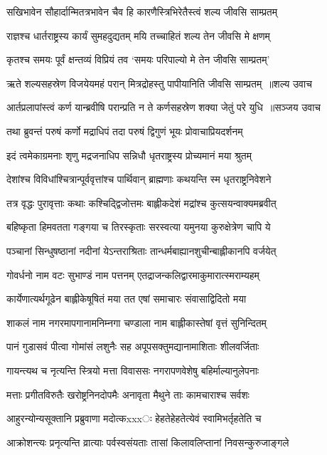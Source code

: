 \twolineshloka
{सखिभावेन सौहार्दान्मितत्रभावेन चैव हि}
{कारणैस्त्रिभिरेतैस्त्वं शल्य जीवसि साम्प्रतम्}


\twolineshloka
{राज्ञश्च धार्तराष्ट्रस्य कार्यं सुमहदुद्यतम्}
{मयि तच्चाहितं शल्य तेन जीवसि मे क्षणम्}


\twolineshloka
{कृतश्च समयः पूर्वं क्षन्तव्यं विप्रियं तव}
{`समयः परिपाल्यो मे तेन जीवसि साम्प्रतम्'}


\threelineshloka
{ऋते शल्यसहस्रेण विजयेयमहं परान्}
{मित्रद्रोहस्तु पापीयानिति जीवसि साम्प्रतम् ॥शल्य उवाच}
{}


\threelineshloka
{आर्तप्रलापांस्त्वं कर्ण यान्ब्रवीषि परान्प्रति}
{न ते कर्णसहस्रेण शक्या जेतुं परे युधि ॥सञ्जय उवाच}
{}


\twolineshloka
{तथा ब्रुवन्तं परुषं कर्णो मद्राधिपं तदा}
{परुषं द्विगुणं भूयः प्रोवाचाप्रियदर्शनम्}


\twolineshloka
{इदं त्वमेकाग्रमनाः शृणु मद्रजनाधिप}
{सन्निधौ धृतराष्ट्रस्य प्रोच्यमानं मया श्रुतम्}


\twolineshloka
{देशांश्च विविधांश्चित्रान्पूर्ववृत्तांश्च पार्थिवान्}
{ब्राह्मणाः कथयन्ति स्म धृतराष्ट्रनिवेशने}


\twolineshloka
{तत्र वृद्धः पुरावृत्ताः कथाः कश्चिद्द्विजोत्तमः}
{बाह्लीकदेशं मद्रांश्च कुत्सयन्वाक्यमब्रवीत्}


\twolineshloka
{बहिष्कृता हिमवतता गङ्गया च तिरस्कृताः}
{सरस्वत्या यमुनया कुरुक्षेत्रेण चापि ये}


\twolineshloka
{पञ्चानां सिन्धुषष्ठानां नदीनां येऽन्तराश्रिताः}
{तान्धर्मबाह्यानशुचीन्बाह्लीकानपि वर्जयेत्}


\twolineshloka
{गोवर्धनो नाम वटः सुभाण्डं नाम पत्तनम्}
{एतद्राजन्कलिद्वारमाकुमारात्स्मराम्यहम्}


\twolineshloka
{कार्येणात्यर्थगूढेन बाह्लीकेषूषितं मया}
{तत एषां समाचारः संवासाद्विदितो मया}


\twolineshloka
{शाकलं नाम नगरमापगानामनिम्नगा}
{चण्डाला नाम बाह्लीकास्तेषां वृत्तं सुनिन्दितम्}


\twolineshloka
{पानं गुडासवं पीत्वा गोमांसं लशुनैः सह}
{अपूपसक्तुमद्यानामाशिताः शीलवर्जिताः}


\twolineshloka
{गायन्त्यथ च नृत्यन्ति स्त्रियो मत्ता विवाससः}
{नगरापणवेशेषु बहिर्माल्यानुलेपनाः}


\twolineshloka
{मत्ताः प्रगीतविरुतैः खरोष्ट्रनिनदोपमैः}
{अनावृता मैथुने ताः कामचाराश्च सर्वशः}


\twolineshloka
{आहुरन्योन्यसूक्तानि प्रब्रुवाणा मदोत्कxxxः}
{हेहतेहेहतेत्येवं स्वामिभर्तृहतेति च}


\twolineshloka
{आक्रोशन्त्यः प्रनृत्यन्ति व्रात्याः पर्वस्वसंयताः}
{तासां किलावलिप्तानां निवसन्कुरुजाङ्गले}


